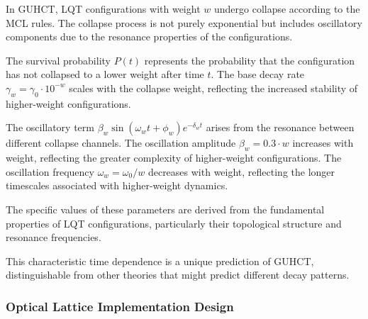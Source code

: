 \documentclass[11pt,a4paper]{article}
\makeatletter
\renewenvironment{proof}[1][\proofname]{\par
  \pushQED{\qed}%
  \normalfont \topsep6\p@\@plus6\p@\relax
  \trivlist
  \item[\hskip\labelsep
        \itshape
    #1\@addpunct{.}]\ignorespaces
}{%
  \popQED\endtrivlist\@endpefalse
}
\makeatother
\begin{document}
\begin{proof}
In GUHCT, LQT configurations with weight $w$ undergo collapse according to the MCL rules. The collapse process is not purely exponential but includes oscillatory components due to the resonance properties of the configurations.

The survival probability $P(t)$ represents the probability that the configuration has not collapsed to a lower weight after time $t$. The base decay rate $\gamma_w = \gamma_0 \cdot 10^{-w}$ scales with the collapse weight, reflecting the increased stability of higher-weight configurations.

The oscillatory term $\beta_w \sin(\omega_w t + \phi_w) e^{-\delta_w t}$ arises from the resonance between different collapse channels. The oscillation amplitude $\beta_w = 0.3 \cdot w$ increases with weight, reflecting the greater complexity of higher-weight configurations. The oscillation frequency $\omega_w = \omega_0 / w$ decreases with weight, reflecting the longer timescales associated with higher-weight dynamics.

The specific values of these parameters are derived from the fundamental properties of LQT configurations, particularly their topological structure and resonance frequencies.

This characteristic time dependence is a unique prediction of GUHCT, distinguishable from other theories that might predict different decay patterns.
\end{proof}

\subsubsection{Optical Lattice Implementation Design}
\label{ssubsec:optical_lattice}
\end{document}
